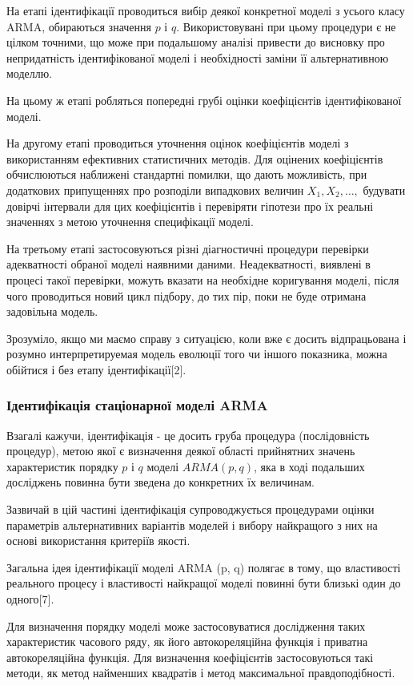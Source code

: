 На етапі ідентифікації проводиться вибір деякої конкретної моделі з усього класу ARMA, обираються значення $p$ і $q$. Використовувані при цьому процедури є не цілком точними, що може при подальшому аналізі привести до висновку про непридатність ідентифікованої моделі і необхідності заміни її альтернативною моделлю. 

На цьому ж етапі робляться попередні грубі оцінки коефіцієнтів ідентифікованої моделі.

На другому етапі проводиться уточнення оцінок коефіцієнтів моделі з використанням ефективних статистичних методів. Для оцінених коефіцієнтів обчислюються наближені стандартні помилки, що дають можливість, при додаткових припущеннях про розподіли випадкових величин $X_{1}, X_{2}, \dots,$ будувати довірчі інтервали для цих коефіцієнтів і перевіряти гіпотези про їх реальні значеннях з метою уточнення специфікації моделі.

На третьому етапі застосовуються різні діагностичні процедури перевірки адекватності обраної моделі наявними даними. Неадекватності, виявлені в процесі такої перевірки, можуть вказати на необхідне коригування моделі, після чого проводиться новий цикл підбору, до тих пір, поки не буде отримана задовільна модель. 

Зрозуміло, якщо ми маємо справу з ситуацією, коли вже є досить відпрацьована і розумно интерпретируемая модель еволюції того чи іншого показника, можна обійтися і без етапу ідентифікації[2].

\subsubsection{Ідентифікація стаціонарної моделі ARMA}

Взагалі кажучи, ідентифікація - це досить груба процедура (послідовність процедур), метою якої є визначення деякої області прийнятних значень характеристик порядку $p$ і $q$ моделі $ARMA(p, q)$, яка в ході подальших досліджень повинна бути зведена до конкретних їх величинам.

Зазвичай в цій частині ідентифікація супроводжується процедурами оцінки параметрів альтернативних варіантів моделей і вибору найкращого з них на основі використання критеріїв якості.

Загальна ідея ідентифікації моделі ARMA (p, q) полягає в тому, що властивості реального процесу і властивості найкращої моделі повинні бути близькі один до одного[7].

Для визначення порядку моделі може застосовуватися дослідження таких характеристик часового ряду, як його автокореляційна функція і приватна автокореляційна функція. Для визначення коефіцієнтів застосовуються такі методи, як метод найменших квадратів і метод максимальної правдоподібності.

